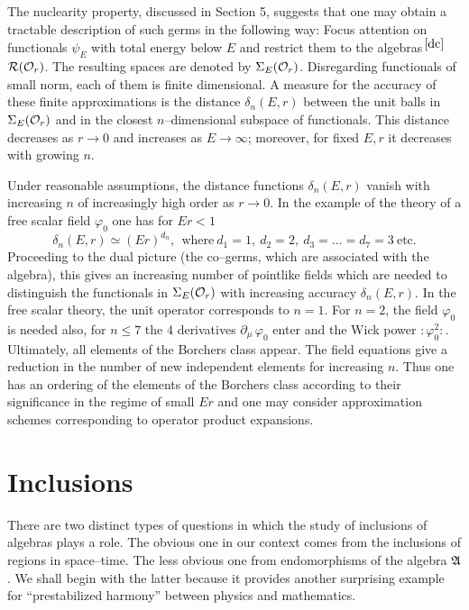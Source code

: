 The nuclearity property,   
discussed in Section 5, suggests that one may obtain a
tractable description of such germs in the following way: Focus
attention on functionals $\psi_E$ with total energy below $E$ and
restrict them to the algebras$^{\, \ref{dc}}$ ${\cal R} ({\cal O}_r)$. 
The resulting spaces are denoted by $\Sigma_E ({\cal O}_r)$.
Disregarding functionals of small norm, each of them  
is finite dimensional. A measure for the accuracy of  
these finite approximations is the distance $\delta_n (E, r)$ 
between the unit balls in $\Sigma_E ({\cal O}_r)$  
and in the closest $n$--dimensional subspace of functionals. 
This distance decreases as $r \to 0$ and increases as 
$E \to \infty$; moreover, for fixed $E,r$ it decreases 
with growing $n$.    

Under reasonable assumptions, the distance functions $\delta_n (E, r)$ 
vanish with increasing $n$ of increasingly high order as
$r \to 0$. In the example of the theory of  
a free scalar field $\varphi_0$ one has for $E r < 1$ 
\begin{equation}
\delta_n(E,r) \simeq (E r)^{d_n}, 
\ \ \mbox{where} \ d_1 = 1, \ d_2 = 2, \ 
d_3 = \dots = d_7 = 3 \   \mbox{etc.} 
\end{equation}
Proceeding to the dual picture (the co--germs, which are  
associated with the algebra), this gives an
increasing number of pointlike fields which are needed to distinguish
the functionals in $\Sigma_E ({\cal O}_r)$  
with increasing accuracy $\delta_n(E,r)$. In the free scalar theory, 
the unit operator corresponds to $n=1$. For $n=2$, the field 
$\varphi_0$ is needed also, for $n \leq 7$
the 4 derivatives $\partial_\mu \, \varphi_0$ enter and the Wick power
$: \! \varphi_0^2 \! :$. 
Ultimately, all elements of the Borchers class appear. The
field equations give a reduction in the number of new independent
elements for increasing $n$. Thus one has an ordering of the elements
of the Borchers class according to their significance in the regime
of small $E r$ and one may consider approximation schemes corresponding
to operator product expansions.

\section{Inclusions}
There are two distinct types of questions in which the study of
inclusions of algebras plays a role. The obvious one in our context
comes from the inclusions of regions in space--time. The less obvious
one from endomorphisms of the algebra ${\mathfrak A}$. We shall begin with
the latter because it provides another surprising example for
``prestabilized harmony'' between physics and mathematics.

